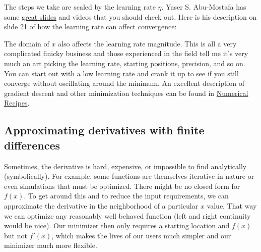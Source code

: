 \documentclass[titlepage]{tufte-book}
\begin{document}
\begin{fullwidth}
The steps we take are scaled by the learning rate $\eta$.  Yaser S. Abu-Mostafa has some \href{http://www.amlbook.com/slides/iTunesU_Lecture09_May_01.pdf}{great slides} and videos that you should check out. Here is his description on slide 21 of how the learning rate can affect convergence:

\begin{center}
\end{center}

The domain of $x$ also affects the learning rate magnitude. This is all a very complicated finicky business and those experienced in the field tell me it's very much an art picking the learning rate, starting positions, precision, and so on. You can start out with a low learning rate and crank it up to see if you still converge without oscillating around the minimum.  \noindent An excellent description of gradient descent and other minimization techniques can be found in \href{http://apps.nrbook.com/fortran/index.html}{Numerical Recipes}.

\subsection{Approximating derivatives with finite differences}

Sometimes, the derivative is hard, expensive, or impossible to find analytically (symbolically).  For example, some functions are themselves iterative in nature or even simulations that must be optimized. There might be no closed form for $f(x)$. To get around this and to reduce the input requirements, we can approximate the derivative in the neighborhood of a particular $x$ value. That way we can optimize any reasonably well behaved function (left and right continuity would be nice). Our minimizer then only requires a starting location and $f(x)$ but not $f'(x)$, which makes the lives of our users much simpler and our minimizer much more flexible. 


\end{fullwidth}
\end{document}
